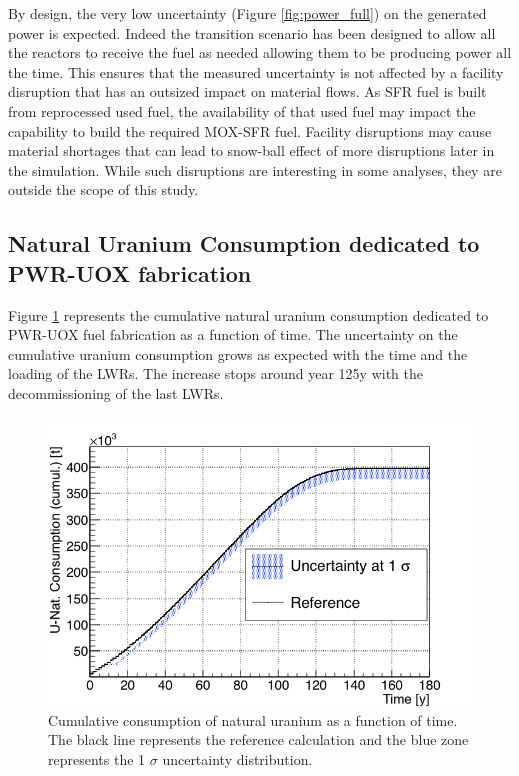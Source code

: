 \documentclass{anstrans}
\begin{document}
By design, the very low uncertainty (Figure \ref{fig:power_full}) on the
generated power is expected.
Indeed the transition scenario has been designed to allow all the reactors to
receive the fuel as needed allowing them to be producing power all the time.
This ensures that the measured uncertainty is not affected by a facility
disruption that has an outsized impact on material flows.
As \gls{SFR} fuel is built from
reprocessed used fuel, the availability of that used fuel may impact the
capability to build the required MOX-SFR fuel.  Facility disruptions may
cause material shortages that can lead to snow-ball effect of more disruptions
later in the simulation.  While such disruptions are interesting in some analyses,
they are outside the scope of this study.

\subsection{Natural Uranium Consumption dedicated to PWR-UOX fabrication}

Figure \ref{fig:unat_full} represents the cumulative natural uranium consumption
dedicated to PWR-UOX fuel fabrication as a function of time.  The uncertainty on
the cumulative uranium consumption grows as expected with the time and the
loading of the \glspl{LWR}.  The increase stops around year 125y with the
decommissioning of the last \glspl{LWR}.

\begin{figure}[ht] %
    \centering
    \includegraphics[scale=0.35]{unat_full}
    \caption{Cumulative consumption of natural uranium as a function of time.  The black line
        represents the reference calculation and the blue zone
        represents the 1 $\sigma$ uncertainty distribution.}\label{fig:unat_full}
\end{figure}
\end{document}
